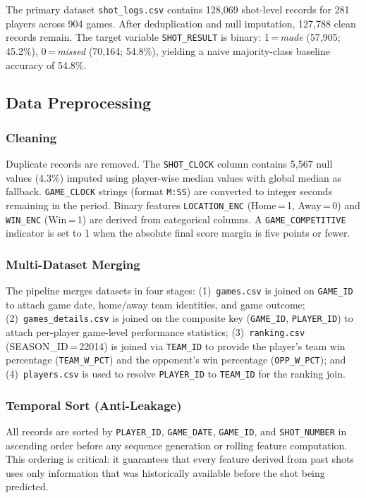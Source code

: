 \documentclass[conference]{IEEEtran}
\begin{document}
The primary dataset \texttt{shot\_logs.csv} contains 128{,}069 shot-level
records for 281 players across 904 games.  After deduplication and null
imputation, 127{,}788 clean records remain.  The target variable
\texttt{SHOT\_RESULT} is binary: 1\,=\,\textit{made} (57{,}905;
45.2\%), 0\,=\,\textit{missed} (70{,}164; 54.8\%), yielding a naive
majority-class baseline accuracy of 54.8\%.

\subsection{Data Preprocessing}

\subsubsection{Cleaning}
Duplicate records are removed.  The \texttt{SHOT\_CLOCK} column contains
5{,}567 null values (4.3\%) imputed using player-wise median values with
global median as fallback.  \texttt{GAME\_CLOCK} strings (format
\texttt{M:SS}) are converted to integer seconds remaining in the period.
Binary features \texttt{LOCATION\_ENC} (Home\,=\,1, Away\,=\,0) and
\texttt{WIN\_ENC} (Win\,=\,1) are derived from categorical columns.  A
\texttt{GAME\_COMPETITIVE} indicator is set to 1 when the absolute final
score margin is five points or fewer.

\subsubsection{Multi-Dataset Merging}
The pipeline merges datasets in four stages: (1)~\texttt{games.csv} is
joined on \texttt{GAME\_ID} to attach game date, home/away team
identities, and game outcome; (2)~\texttt{games\_details.csv} is joined
on the composite key (\texttt{GAME\_ID}, \texttt{PLAYER\_ID}) to attach
per-player game-level performance statistics; (3)~\texttt{ranking.csv}
(SEASON\_ID\,=\,22014) is joined via \texttt{TEAM\_ID} to provide the
player's team win percentage (\texttt{TEAM\_W\_PCT}) and the opponent's
win percentage (\texttt{OPP\_W\_PCT}); and (4)~\texttt{players.csv} is
used to resolve \texttt{PLAYER\_ID} to \texttt{TEAM\_ID} for the ranking
join.

\subsubsection{Temporal Sort (Anti-Leakage)}
All records are sorted by \texttt{PLAYER\_ID}, \texttt{GAME\_DATE},
\texttt{GAME\_ID}, and \texttt{SHOT\_NUMBER} in ascending order before
any sequence generation or rolling feature computation.  This ordering is
critical: it guarantees that every feature derived from past shots uses
only information that was historically available before the shot being
predicted.
\end{document}

